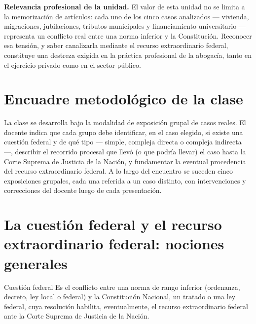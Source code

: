 \documentclass[12pt,oneside]{book}
\begin{document}
\begin{important}
\textbf{Relevancia profesional de la unidad.} El valor de esta unidad no se limita a la memorización de artículos: cada uno de los cinco casos analizados --- vivienda, migraciones, jubilaciones, tributos municipales y financiamiento universitario --- representa un conflicto real entre una norma inferior y la Constitución. Reconocer esa tensión, y saber canalizarla mediante el recurso extraordinario federal, constituye una destreza exigida en la práctica profesional de la abogacía, tanto en el ejercicio privado como en el sector público.
\end{important}

\section{Encuadre metodológico de la clase}

La clase se desarrolla bajo la modalidad de exposición grupal de casos reales. El docente indica que cada grupo debe identificar, en el caso elegido, si existe una cuestión federal y de qué tipo --- simple, compleja directa o compleja indirecta ---, describir el recorrido procesal que llevó (o que podría llevar) el caso hasta la Corte Suprema de Justicia de la Nación, y fundamentar la eventual procedencia del recurso extraordinario federal. A lo largo del encuentro se suceden cinco exposiciones grupales, cada una referida a un caso distinto, con intervenciones y correcciones del docente luego de cada presentación.

\section{La cuestión federal y el recurso extraordinario federal: nociones generales}

\begin{definition}{Cuestión federal}
Es el conflicto entre una norma de rango inferior (ordenanza, decreto, ley local o federal) y la Constitución Nacional, un tratado o una ley federal, cuya resolución habilita, eventualmente, el recurso extraordinario federal ante la Corte Suprema de Justicia de la Nación.
\end{definition}
\end{document}
